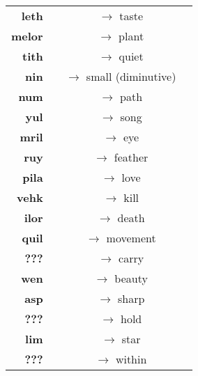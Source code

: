 \begin{tabular}{r c c l}
\textbf{leth} &&$\rightarrow$ taste \\
\textbf{melor} &&$\rightarrow$ plant \\
\textbf{tith} &&$\rightarrow$ quiet \\
\textbf{nin} &&$\rightarrow$ small (diminutive) \\
\textbf{num} &&$\rightarrow$ path \\
\textbf{yul} &&$\rightarrow$ song \\
\textbf{mril} &&$\rightarrow$ eye \\
\textbf{ruy} &&$\rightarrow$ feather \\
\textbf{pila} &&$\rightarrow$ love \\
\textbf{vehk} &&$\rightarrow$ kill \\
\textbf{ilor} &&$\rightarrow$ death \\
\textbf{quil} &&$\rightarrow$ movement \\
\textbf{???} &&$\rightarrow$ carry \\
\textbf{wen} &&$\rightarrow$ beauty \\
\textbf{asp} &&$\rightarrow$ sharp \\
\textbf{???} &&$\rightarrow$ hold \\
\textbf{lim} &&$\rightarrow$ star \\
\textbf{???} &&$\rightarrow$ within \\
\end{tabular}

